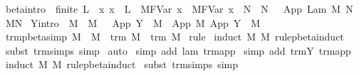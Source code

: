 \begin{isabellebody}
{\isacharbar}\ beta{\isacharbrackleft}intro{\isacharbrackright}{\isacharcolon}\ {\isachardoublequoteopen}{\isasymlbrakk}\ finite\ L\ {\isacharsemicolon}\ {\isacharparenleft}{\isasymAnd}x{\isachardot}\ x\ {\isasymnotin}\ L\ {\isasymLongrightarrow}\ M{\isacharcircum}{\isacharparenleft}FVar\ x{\isacharparenright}\ {\isasymggreater}\ M{\isacharprime}{\isacharcircum}{\isacharparenleft}FVar\ x{\isacharparenright}{\isacharparenright}\ {\isacharsemicolon}\ N\ {\isasymggreater}\ N{\isacharprime}\ {\isasymrbrakk}\ {\isasymLongrightarrow}\ App\ {\isacharparenleft}Lam\ M{\isacharparenright}\ N\ {\isasymggreater}\ M{\isacharprime}{\isacharcircum}N{\isacharprime}{\isachardoublequoteclose}\isanewline
{\isacharbar}\ Y{\isacharbrackleft}intro{\isacharbrackright}{\isacharcolon}\ {\isachardoublequoteopen}{\isasymlbrakk}\ M\ {\isasymggreater}\ M{\isacharprime}\ {\isasymrbrakk}\ {\isasymLongrightarrow}\ App\ {\isacharparenleft}Y\ {\isasymsigma}{\isacharparenright}\ M\ {\isasymggreater}\ App\ M{\isacharprime}\ {\isacharparenleft}App\ {\isacharparenleft}Y\ {\isasymsigma}{\isacharparenright}\ M{\isacharprime}{\isacharparenright}{\isachardoublequoteclose}\isanewline
\isanewline
{}\isamarkupfalse%
\ trm{\isacharunderscore}pbeta{\isacharunderscore}simp{}{\isacharcolon}\ {\isachardoublequoteopen}M\ {\isasymggreater}\ M{\isacharprime}\ {\isasymLongrightarrow}\ trm\ M\ {\isasymand}\ trm\ M{\isacharprime}{\isachardoublequoteclose}\isanewline
%
\isadelimproof
%
\endisadelimproof
%
\isatagproof
{}\isamarkupfalse%
\ rule\isanewline
{}\isamarkupfalse%
\ {\isacharparenleft}induct\ M\ M{\isacharprime}\ rule{\isacharcolon}pbeta{\isachardot}induct{\isacharparenright}\isanewline
{}\isamarkupfalse%
\ {\isacharparenleft}subst\ trm{\isachardot}simps{\isacharcomma}\ simp{\isacharparenright}{\isacharplus}\isanewline
{}\isamarkupfalse%
\ auto{\isacharbrackleft}{}{\isacharbrackright}\isanewline
{}\isamarkupfalse%
\ {\isacharparenleft}simp\ add{\isacharcolon}\ lam\ trm{\isachardot}app{\isacharparenright}\isanewline
{}\isamarkupfalse%
\ {\isacharparenleft}simp\ add{\isacharcolon}\ trm{\isachardot}Y\ trm{\isachardot}app{\isacharparenright}\isanewline
{}\isamarkupfalse%
\ {\isacharparenleft}induct\ M\ M{\isacharprime}\ rule{\isacharcolon}pbeta{\isachardot}induct{\isacharparenright}\isanewline
{}\isamarkupfalse%
\ {\isacharparenleft}subst\ trm{\isachardot}simps{\isacharcomma}\ simp{\isacharparenright}{\isacharplus}\isanewline
{}\isamarkupfalse%

\end{isabellebody}
